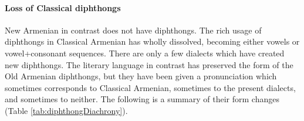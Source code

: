 \begin{table}[H]
	\centering
	\caption{Front round vowels in borrowings in literary Armenian (Standard Western Armenian)}
	\label{tab:frontRoundLiterary}
	\end{table}

\paragraph{Loss of Classical diphthongs}\label{sec:AdjarianIntro:difference:soundChange:DiphthongLoss}

New Armenian in contrast does not have diphthongs. The rich usage of diphthongs in Classical Armenian has wholly dissolved, becoming either vowels or vowel+consonant sequences. There are only a few dialects which have created new diphthongs. The literary language in contrast has preserved the form of the Old Armenian diphthongs, but they have been given a pronunciation which sometimes corresponds to Classical Armenian, sometimes to the present dialects, and sometimes to neither. The following is a summary of their form changes (Table \ref{tab:diphthongDiachrony}). 

